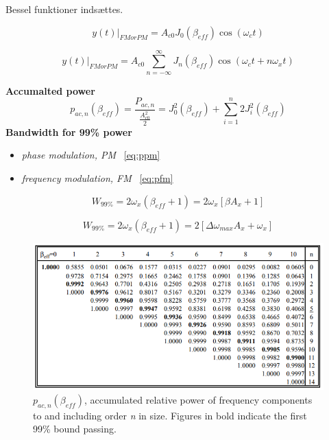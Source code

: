 Bessel funktioner indsættes.

\begin{equation}
y(t)|_{FM or PM} = A_{c0}J_0 (\beta_{eff})\cos(\omega_c t)
\end{equation}

\begin{equation}
y(t)|_{FM or PM} = A_{c0} \sum_{n=-\infty}^{\infty}J_n(\beta_{eff})\cos(\omega_c t+n\omega_x t)
\end{equation}

\newpage\noindent\textbf{Accumalted power}
\begin{equation}
p_{ac,n}(\beta_{eff}) = \dfrac{P_{ac,n}}{\frac{A_{c0}^2}{2}}=J_0^2(\beta_{eff})+\sum_{i=1}^{n}2J_i^2(\beta_{eff})
\end{equation}
\noindent\textbf{Bandwidth for 99\% power}
\begin{itemize}
	\item \textit{phase modulation, PM} ~\ref{eq:ppm}
	\item \textit{frequency modulation, FM} ~\ref{eq:pfm}
\end{itemize}

\begin{equation}\label{eq:ppm}
W_{99\%}=2\omega_x(\beta_{eff}+1)=2\omega_x[\beta A_x+1]
\end{equation}

\begin{equation}\label{eq:pfm}
W_{99\%}=2\omega_x(\beta_{eff}+1)=2[\Delta\omega_{max} A_x+\omega_x]
\end{equation}

\begin{figure} [H]
	\centering
	\includegraphics[width=\linewidth]{graphics/14.png}
	\caption{$p_{ac,n}(\beta_{eff})$, accumulated relative power of frequency components to and including	order \textit{n} in size. Figures in bold indicate the first 99\% bound passing.}
	\label{fig:14}
\end{figure}

